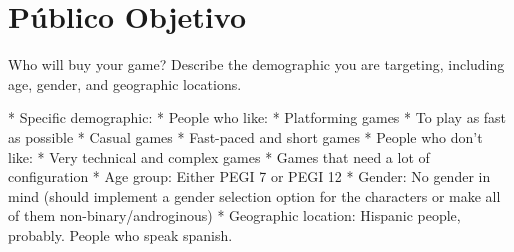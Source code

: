 \chapter{Público Objetivo}
Who will buy your game? Describe the demographic you are targeting, including age, gender, and geographic locations.

* Specific demographic:
    * People who like:
        * Platforming games
        * To play as fast as possible
        * Casual games
        * Fast-paced and short games
    * People who don't like:
        * Very technical and complex games
        * Games that need a lot of configuration
* Age group: Either PEGI 7 or PEGI 12
* Gender: No gender in mind (should implement a gender selection option for the characters or make all of them non-binary/androginous)
* Geographic location: Hispanic people, probably. People who speak spanish.